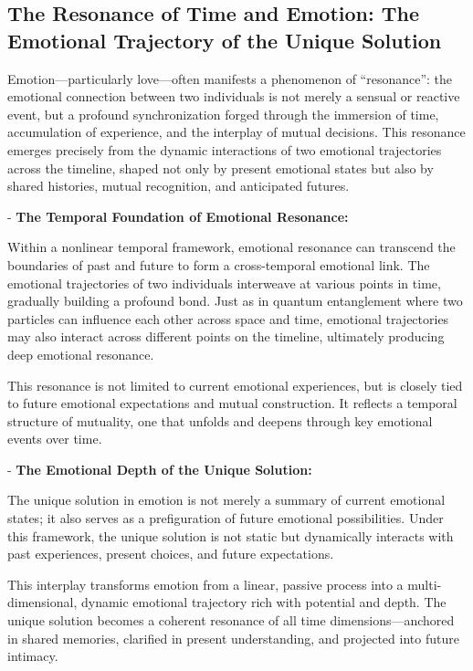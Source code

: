 \documentclass{article}
\begin{document}
\subsection{The Resonance of Time and Emotion: The Emotional Trajectory of the Unique Solution}

Emotion—particularly love—often manifests a phenomenon of “resonance”: the emotional connection between two individuals is not merely a sensual or reactive event, but a profound synchronization forged through the immersion of time, accumulation of experience, and the interplay of mutual decisions. This resonance emerges precisely from the dynamic interactions of two emotional trajectories across the timeline, shaped not only by present emotional states but also by shared histories, mutual recognition, and anticipated futures.

- \textbf{The Temporal Foundation of Emotional Resonance: }

Within a nonlinear temporal framework, emotional resonance can transcend the boundaries of past and future to form a cross-temporal emotional link. The emotional trajectories of two individuals interweave at various points in time, gradually building a profound bond. Just as in quantum entanglement where two particles can influence each other across space and time, emotional trajectories may also interact across different points on the timeline, ultimately producing deep emotional resonance.

This resonance is not limited to current emotional experiences, but is closely tied to future emotional expectations and mutual construction. It reflects a temporal structure of mutuality, one that unfolds and deepens through key emotional events over time.

- \textbf{The Emotional Depth of the Unique Solution: }

The unique solution in emotion is not merely a summary of current emotional states; it also serves as a prefiguration of future emotional possibilities. Under this framework, the unique solution is not static but dynamically interacts with past experiences, present choices, and future expectations. 

This interplay transforms emotion from a linear, passive process into a multi-dimensional, dynamic emotional trajectory rich with potential and depth. The unique solution becomes a coherent resonance of all time dimensions—anchored in shared memories, clarified in present understanding, and projected into future intimacy.
\end{document}

